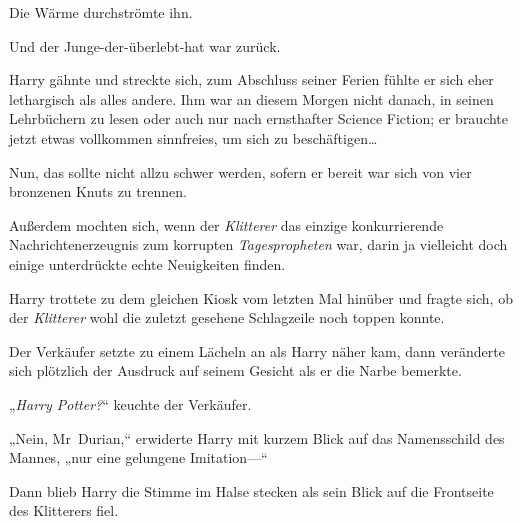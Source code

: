 Die Wärme durchströmte ihn.

Und der Junge-der-überlebt-hat war zurück.

Harry gähnte und streckte sich, zum Abschluss seiner Ferien fühlte er sich eher lethargisch als alles andere. Ihm war an diesem Morgen nicht danach, in seinen Lehrbüchern zu lesen oder auch nur nach ernsthafter Science Fiction; er brauchte jetzt etwas vollkommen sinnfreies, um sich zu beschäftigen…

Nun, das sollte nicht allzu schwer werden, sofern er bereit war sich von vier bronzenen Knuts zu trennen.

Außerdem mochten sich, wenn der \emph{Klitterer} das einzige konkurrierende Nachrichtenerzeugnis zum korrupten \emph{Tagespropheten} war, darin ja vielleicht doch einige unterdrückte echte Neuigkeiten finden.

Harry trottete zu dem gleichen Kiosk vom letzten Mal hinüber und fragte sich, ob der \emph{Klitterer} wohl die zuletzt gesehene Schlagzeile noch toppen konnte.

Der Verkäufer setzte zu einem Lächeln an als Harry näher kam, dann veränderte sich plötzlich der Ausdruck auf seinem Gesicht als er die Narbe bemerkte.

„\emph{Harry Potter?}“ keuchte der Verkäufer.

„Nein, Mr~Durian,“ erwiderte Harry mit kurzem Blick auf das Namensschild des Mannes, „nur eine gelungene Imitation—“

Dann blieb Harry die Stimme im Halse stecken als sein Blick auf die Frontseite des Klitterers fiel.

